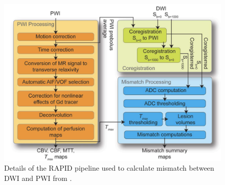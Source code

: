 \begin{frame}
\begin{columns}[T]
    \begin{column}{0.42\textwidth}                 %
        \begin{figure}
            \centering
            \includegraphics[width=\linewidth]{figures/intro-straka.png}
            \caption{Details of the RAPID pipeline used to calculate mismatch between DWI and PWI from \cite{strakaRealTimeDiffusion2010}.}
            \label{fig:straka}
        \end{figure}
    \end{column}
    \end{columns}   %

\end{frame}

